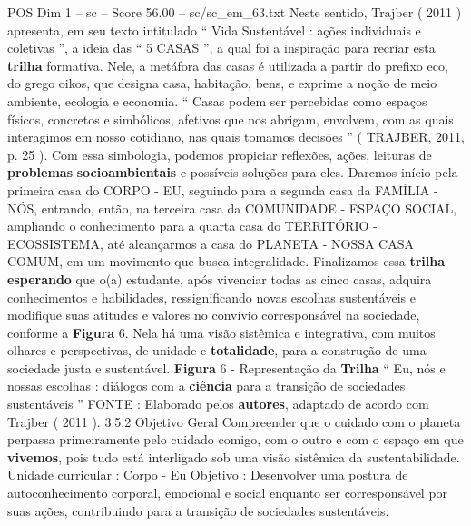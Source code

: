 \begin{textsample}{POS Dim 1 – sc – Score 56.00 – sc/sc\_em\_63.txt}
Neste sentido, Trajber ( 2011 ) apresenta, em seu texto intitulado “ Vida Sustentável : ações individuais e coletivas ”, a ideia das “ 5 CASAS ”, a qual foi a inspiração para recriar esta \textbf{trilha} formativa.
Nele, a metáfora das casas é utilizada a partir do prefixo eco, do grego oikos, que designa casa, habitação, bens, e exprime a noção de meio ambiente, ecologia e economia. “ Casas podem ser percebidas como espaços físicos, concretos e simbólicos, afetivos que nos abrigam, envolvem, com as quais interagimos em nosso cotidiano, nas quais tomamos decisões ” ( TRAJBER, 2011, p. 25 ).
Com essa simbologia, podemos propiciar reflexões, ações, leituras de \textbf{problemas} \textbf{socioambientais} e possíveis soluções para eles.
Daremos início pela primeira casa do CORPO - EU, seguindo para a segunda casa da FAMÍLIA - NÓS, entrando, então, na terceira casa da COMUNIDADE - ESPAÇO SOCIAL, ampliando o conhecimento para a quarta casa do TERRITÓRIO - ECOSSISTEMA, até alcançarmos a casa do PLANETA - NOSSA CASA COMUM, em um movimento que busca integralidade.
Finalizamos essa \textbf{trilha} \textbf{esperando} que o(a) estudante, após vivenciar todas as cinco casas, adquira conhecimentos e habilidades, ressignificando novas escolhas sustentáveis e modifique suas atitudes e valores no convívio corresponsável na sociedade, conforme a \textbf{Figura} 6.
Nela há uma visão sistêmica e integrativa, com muitos olhares e perspectivas, de unidade e \textbf{totalidade}, para a construção de uma sociedade justa e sustentável. \textbf{Figura} 6 - Representação da \textbf{Trilha} “ Eu, nós e nossas escolhas : diálogos com a \textbf{ciência} para a transição de sociedades sustentáveis ” FONTE : Elaborado pelos \textbf{autores}, adaptado de acordo com Trajber ( 2011 ). 3.5.2 Objetivo Geral Compreender que o cuidado com o planeta perpassa primeiramente pelo cuidado comigo, com o outro e com o espaço em que \textbf{vivemos}, pois tudo está interligado sob uma visão sistêmica da sustentabilidade.
Unidade curricular : Corpo - Eu Objetivo : Desenvolver uma postura de autoconhecimento corporal, emocional e social enquanto ser corresponsável por suas ações, contribuindo para a transição de sociedades sustentáveis.

\end{textsample}
